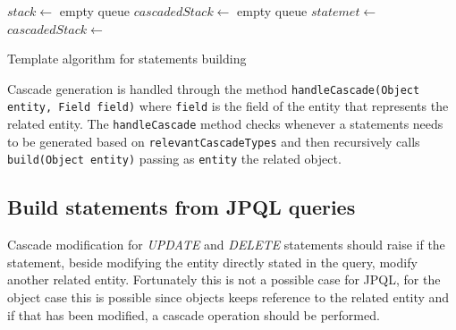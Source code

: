\begin{algorithm}[h]
  \begin{algorithmic}[1]
    \State $stack \gets$ empty queue
    \State $cascadedStack \gets$ empty queue
	\State $statemet \gets$ 
    \State {}
          \State $cascadedStack \gets$ 
        \EndIf
          \State {}
        \Else
        	  \State {}
        	\EndIf
      \Else
          \State {}
        	\EndIf
      \EndIf
          \State {}
        \Else
          \State {}
        \EndIf
    \EndFor        
    \State {}
      \State {}
    \EndIf
  \EndFunction
  \end{algorithmic}
  \caption{Template algorithm for statements building}
  \label{code:statements-building}
\end{algorithm}

\noindent Cascade generation is handled through the method \texttt{handleCascade(Object entity, Field field)} where \texttt{field} is the field of the entity that represents the related entity. The \texttt{handleCascade} method checks whenever a statements needs to be generated based on \texttt{relevantCascadeTypes} and then recursively calls \texttt{build(Object entity)} passing as \texttt{entity} the related object. 

\subsection{Build statements from JPQL queries}
Cascade modification for \textit{UPDATE} and \textit{DELETE} statements should raise if the statement, beside modifying the entity directly stated in the query, modify another related entity. Fortunately this is not a possible case for JPQL, for the object case this is possible since objects keeps reference to the related entity and if that has been modified, a cascade operation should be performed.
 
